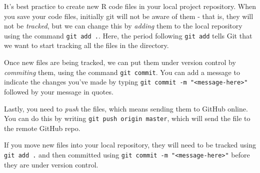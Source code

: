 \documentclass[
]{book}
\newenvironment{Shaded}{\begin{snugshade}}{\end{snugshade}}
\newcommand{\ErrorTok}[1]{\textcolor[rgb]{0.64,0.00,0.00}{\textbf{#1}}}
\newcommand{\NormalTok}[1]{#1}
\newcommand{\SpecialCharTok}[1]{\textcolor[rgb]{0.00,0.00,0.00}{#1}}
\newcommand{\StringTok}[1]{\textcolor[rgb]{0.31,0.60,0.02}{#1}}
\begin{document}
It's best practice to create new R code files in your local project repository. When you save your code files, initially git will not be aware of them - that is, they will not be \emph{tracked}, but we can change this by \emph{adding} them to the local repository using the command \texttt{git\ add\ .}. Here, the period following \texttt{git\ add} tells Git that we want to start tracking all the files in the directory.

\begin{Shaded}
\end{Shaded}

Once new files are being tracked, we can put them under version control by \emph{commiting} them, using the command \texttt{git\ commit}. You can add a message to indicate the changes you've made by typing \texttt{git\ commit\ -m\ "\textless{}message-here\textgreater{}"} followed by your message in quotes.

\begin{Shaded}
\end{Shaded}

Lastly, you need to \emph{push} the files, which means sending them to GitHub online. You can do this by writing \texttt{git\ push\ origin\ master}, which will send the file to the remote GitHub repo.

\begin{Shaded}
\end{Shaded}

If you move new files into your local repository, they will need to be tracked using \texttt{git\ add\ .} and then committed using \texttt{git\ commit\ -m\ "\textless{}message-here\textgreater{}"} before they are under version control.
\end{document}
